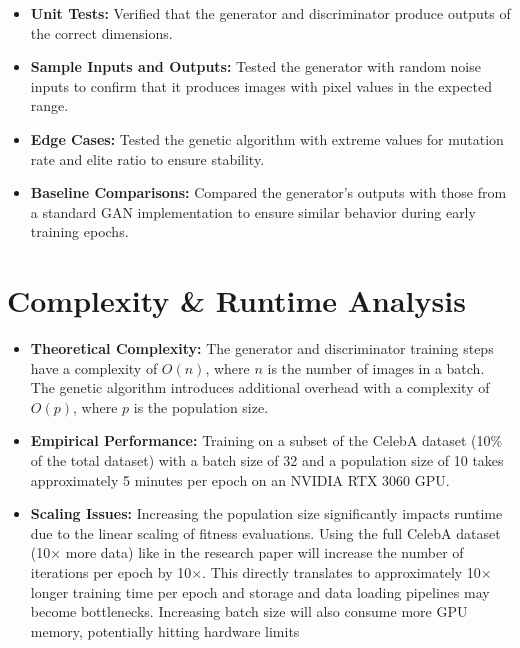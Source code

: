 \documentclass[12pt]{article}
\begin{document}
\begin{itemize}
    \item \textbf{Unit Tests:} Verified that the generator and discriminator produce outputs of the correct dimensions.
    \item \textbf{Sample Inputs and Outputs:} Tested the generator with random noise inputs to confirm that it produces images with pixel values in the expected range.
    \item \textbf{Edge Cases:} Tested the genetic algorithm with extreme values for mutation rate and elite ratio to ensure stability.
    \item \textbf{Baseline Comparisons:} Compared the generator's outputs with those from a standard GAN implementation to ensure similar behavior during early training epochs.
\end{itemize}

\section*{Complexity \& Runtime Analysis}
\begin{itemize}
    \item \textbf{Theoretical Complexity:}  
    The generator and discriminator training steps have a complexity of \(O(n)\), where \(n\) is the number of images in a batch. The genetic algorithm introduces additional overhead with a complexity of \(O(p)\), where \(p\) is the population size.

    \item \textbf{Empirical Performance:}  
    Training on a subset of the CelebA dataset (10\% of the total dataset) with a batch size of 32 and a population size of 10 takes approximately 5 minutes per epoch on an NVIDIA RTX 3060 GPU.

    \item \textbf{Scaling Issues:}  
    Increasing the population size significantly impacts runtime due to the linear scaling of fitness evaluations. Using the full CelebA dataset (10× more data) like in the research paper will increase the number of iterations per epoch by 10×. This directly translates to approximately 10× longer training time per epoch and storage and data loading pipelines may become bottlenecks. Increasing batch size will also consume more GPU memory, potentially hitting hardware limits
\end{itemize}
\end{document}
